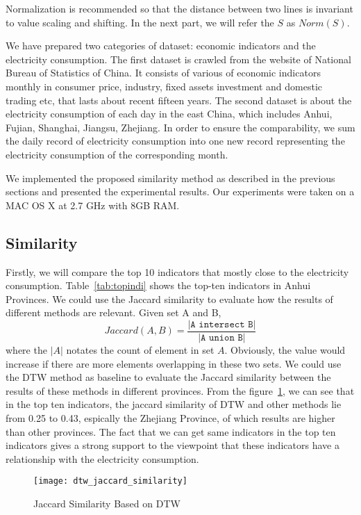 \documentclass{sig-alternate-05-2015}
\begin{document}
Normalization is recommended so that the distance between two lines is invariant to value scaling and shifting. In the next part, we will refer the $S$ as $Norm(S)$. 

We have prepared two categories of dataset: economic indicators and the electricity consumption. The first dataset is crawled from the website of National Bureau of Statistics of China. It consists of various of economic indicators monthly in consumer price, industry, fixed assets investment and domestic trading etc, that lasts about recent fifteen years. The second dataset is about the electricity consumption of each day in the east China, which includes Anhui, Fujian, Shanghai, Jiangsu, Zhejiang. In order to ensure the comparability, we sum the daily record of electricity consumption into one new record representing the electricity consumption of the corresponding month. 

We implemented the proposed similarity method as described in the previous sections and presented the experimental results. Our experiments were taken on a MAC OS X at 2.7 GHz with 8GB RAM.

\subsection{Similarity}
Firstly, we will compare the top 10 indicators that mostly close to the electricity consumption. Table~\ref{tab:topindi} shows the top-ten indicators in Anhui Provinces. We could use the Jaccard similarity to evaluate how the results of different methods are relevant. Given set A and B, 
\begin{equation}
	Jaccard(A, B) = \frac{\texttt{|A intersect B|}}{\texttt{|A union B|}}
\end{equation} 
where the $|A|$ notates the count of element in set $A$. Obviously, the value would increase if there are more elements overlapping in these two sets. We could use the DTW method as baseline to evaluate the Jaccard similarity between the results of these methods in different provinces. From the figure~\ref{fig:Jaccard}, we can see that in the top ten indicators, the jaccard similarity of DTW and other methods lie from 0.25 to 0.43, espically the Zhejiang Province, of which results are higher than other provinces. The fact that we can get same indicators in the top ten indicators gives a strong support to the viewpoint that these indicators have a relationship with the electricity consumption.
\begin{figure}
	\centering
	\texttt{[image: dtw\_jaccard\_similarity]}
	\caption{Jaccard Similarity Based on DTW}
	\label{fig:Jaccard}
\end{figure}
\end{document}
